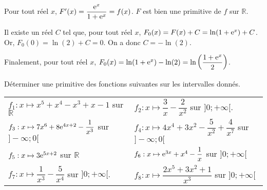 \documentclass[11pt,fleqn, openany]{book} %
\begin{document}
\begin{solution}
 Pour tout réel \(x\), \(F'(x)=\dfrac{\mathrm{e}^x}{1+\mathrm{e}^x}=f(x)\). \(F\) est bien une primitive de \(f\) sur \(\mathbb{R}\).

Il existe un réel \(C\) tel que, pour tout réel \(x\), \(F_0(x)=F(x)+C=\ln(1+\mathrm{e}^x)+C\). Or, \(F_0(0)=\ln(2)+C=0\). On a donc \(C=-\ln(2)\). 

Finalement, pour tout réel \(x\), \(F_0(x)=\ln(1+\mathrm{e}^x)-\ln(2)=\ln\left(\dfrac{1+\mathrm{e}^x}{2}\right)\).

 \end{solution}





\begin{exercise}[topic=diff02]Déterminer une primitive des fonctions suivantes sur les intervalles donnés.

\renewcommand{\arraystretch}{2}
\begin{tabularx}{\linewidth}{XX}
 $f_1 : x\mapsto x^5 + x^4 - x^3 + x -1$ sur $\mathbb{R}$
&
 $f_2:x \mapsto \dfrac{3}{x}-\dfrac{2}{x^2}$ sur $]0;+\infty[$.
\\
 $f_3:x \mapsto 7x^6+8\mathrm{e}^{4x+2}-\dfrac{1}{x^3}$ sur $]-\infty;0[$
&
 $f_4:x\mapsto 4x^4+3x^2-\dfrac{5}{x^2}+\dfrac{4}{x^7}$ sur $]-\infty;
0[$
\\
 $f_5:x\mapsto 3\mathrm{e}^{5x+2}$ sur $\mathbb{R}$
&
$f_6:x\mapsto \mathrm{e}^{3x}+x^4-\dfrac{1}{x}$ sur $]0;+\infty[$
\\
 $f_7:x \mapsto \dfrac{1}{x^3}-\dfrac{5}{x^4}$ sur $]0;+\infty[$.
 &
 $f_8:x\mapsto \dfrac{2x^5+3x^2+1}{x^3}$ sur $]0;+\infty[$
\end{tabularx}\end{exercise}
\end{document}
